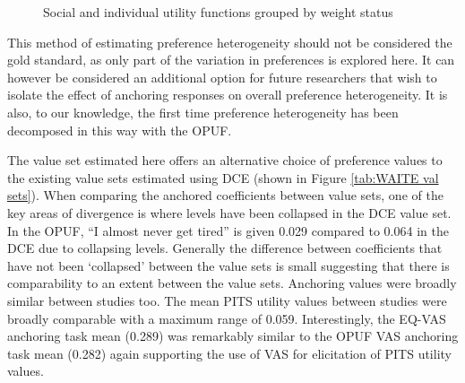 \documentclass[
  number,
  preprint]{elsarticle}
\begin{document}
\begin{figure}


\caption{\label{fig-weight}Social and individual utility functions
grouped by weight status}

\end{figure}%

This method of estimating preference heterogeneity should not be
considered the gold standard, as only part of the variation in
preferences is explored here. It can however be considered an additional
option for future researchers that wish to isolate the effect of
anchoring responses on overall preference heterogeneity. It is also, to
our knowledge, the first time preference heterogeneity has been
decomposed in this way with the OPUF.

The value set estimated here offers an alternative choice of preference
values to the existing value sets estimated using DCE (shown in Figure
\ref{tab:WAITE val sets}). When comparing the anchored coefficients
between value sets, one of the key areas of divergence is where levels
have been collapsed in the DCE value set. In the OPUF, ``I almost never
get tired'' is given 0.029 compared to 0.064 in the DCE due to
collapsing levels. Generally the difference between coefficients that
have not been `collapsed' between the value sets is small suggesting
that there is comparability to an extent between the value sets.
Anchoring values were broadly similar between studies too. The mean PITS
utility values between studies were broadly comparable with a maximum
range of 0.059. Interestingly, the EQ-VAS anchoring task mean (0.289)
was remarkably similar to the OPUF VAS anchoring task mean (0.282) again
supporting the use of VAS for elicitation of PITS utility values.
\end{document}
